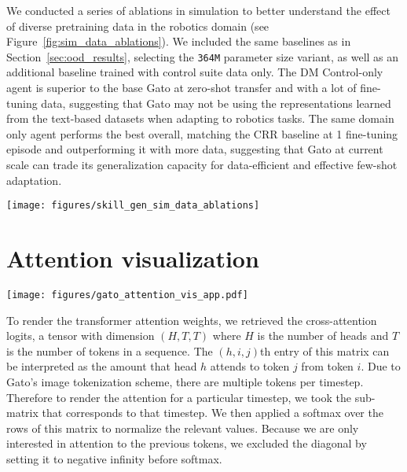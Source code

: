 \documentclass[10pt]{article} \usepackage[accepted]{tmlr}
\newcommand{\model}{{Gato}}
\begin{document}
We conducted a series of ablations in simulation to better understand the effect of diverse pretraining data in the robotics domain (see Figure~\ref{fig:sim_data_ablations}). We included the same baselines as in Section~\ref{sec:ood_results}, selecting the \texttt{364M} parameter size variant, as well as an additional baseline trained with control suite data only.
The DM Control-only agent is superior to the base \model{} at zero-shot transfer and with a lot of fine-tuning data, suggesting that \model{} may not be using the representations learned from the text-based datasets when adapting to robotics tasks. The same domain only agent performs the best overall, matching the CRR baseline at 1 fine-tuning episode and outperforming it with more data, suggesting that \model{} at current scale can trade its generalization capacity for data-efficient and effective few-shot adaptation. 


\begin{figure*}[t]
    \texttt{[image: figures/skill\_gen\_sim\_data\_ablations]}    
    \caption{{\bf Few-shot performance of \model{} for Skill Generalization in simulation.} Each test set object is plotted separately. We ablate over different pretraining datasets.
    \label{fig:sim_data_ablations}}
\end{figure*}

\section{Attention visualization} \label{attention_appendix}

\begin{figure*}[t]
    \centering
    \texttt{[image: figures/gato\_attention\_vis\_app.pdf]}
    \caption{
    {\bf Attention maps.} Time-lapse attention maps from selected heads at the first layer for Atari Breakout, Boxing, Pong, Freeway, Procgen CoinRun, Bossfight, RGB Stacking, and DM Control Suite Cheetah.
    \small}
    \label{fig:attention_app}
\end{figure*}

To render the transformer attention weights, we retrieved the cross-attention logits, a tensor with dimension $(H, T, T)$ where $H$ is the number of heads and $T$ is the number of tokens in a sequence. The $(h, i, j)$th entry of this matrix can be interpreted as the amount that head $h$ attends to token $j$ from token $i$.
Due to Gato's image tokenization scheme, there are multiple tokens per timestep. Therefore to render the attention for a particular timestep, we took the sub-matrix that corresponds to that timestep. We then applied a softmax over the rows of this matrix to normalize the relevant values. Because we are only interested in attention to the previous tokens, we excluded the diagonal by setting it to negative infinity before softmax.
\end{document}
